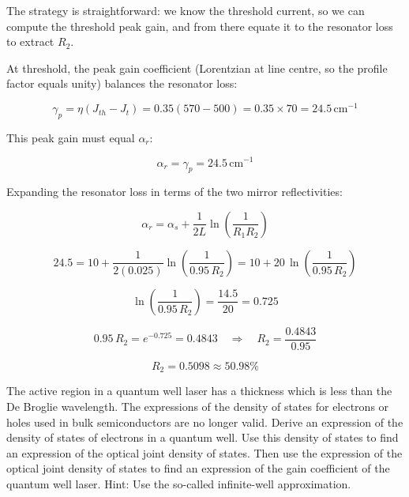 The strategy is straightforward: we know the threshold current, so we can compute the threshold peak gain, and from there equate it to the resonator loss to extract $R_2$.

At threshold, the peak gain coefficient (Lorentzian at line centre, so the profile factor equals unity) balances the resonator loss:

\begin{equation*}
  \gamma_p = \eta(J_{th} - J_t) = 0.35(570 - 500) = 0.35 \times 70 = 24.5\,\text{cm}^{-1}
\end{equation*}

This peak gain must equal $\alpha_r$:

\begin{equation*}
  \alpha_r = \gamma_p = 24.5\,\text{cm}^{-1}
\end{equation*}

Expanding the resonator loss in terms of the two mirror reflectivities:

\begin{equation*}
  \alpha_r = \alpha_s + \frac{1}{2L}\ln\!\left(\frac{1}{R_1 R_2}\right)
\end{equation*}

\begin{equation*}
  24.5 = 10 + \frac{1}{2(0.025)}\ln\!\left(\frac{1}{0.95\,R_2}\right) = 10 + 20\,\ln\!\left(\frac{1}{0.95\,R_2}\right)
\end{equation*}

\begin{equation*}
  \ln\!\left(\frac{1}{0.95\,R_2}\right) = \frac{14.5}{20} = 0.725
\end{equation*}

\begin{equation*}
  0.95\,R_2 = e^{-0.725} = 0.4843 \quad\Longrightarrow\quad R_2 = \frac{0.4843}{0.95}
\end{equation*}

\begin{equation*}
  \boxed{R_2 = 0.5098 \approx 50.98\%}
\end{equation*}

\begin{question}
The active region in a quantum well laser has a thickness which is less than the De Broglie wavelength. The expressions of the density of states for electrons or holes used in bulk semiconductors are no longer valid. Derive an expression of the density of states of electrons in a quantum well. Use this density of states to find an expression of the optical joint density of states. Then use the expression of the optical joint density of states to find an expression of the gain coefficient of the quantum well laser. Hint: Use the so-called infinite-well approximation.
\end{question}

